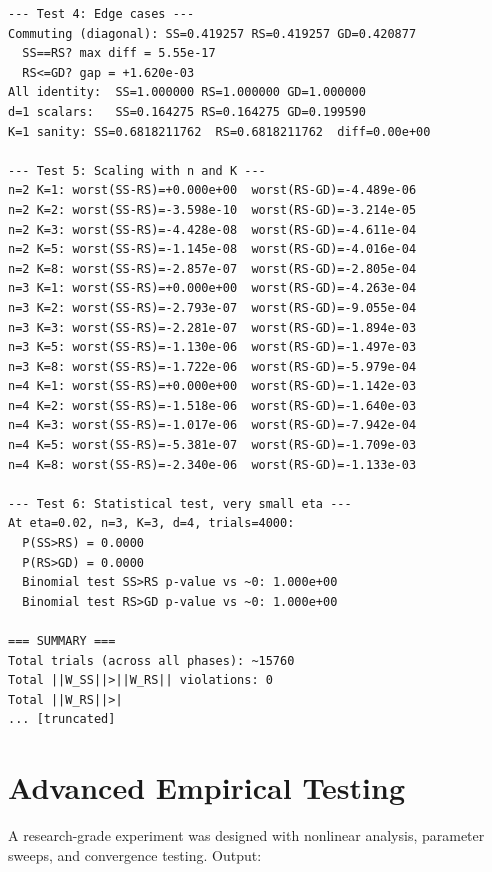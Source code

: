 \documentclass[11pt]{article}
\begin{document}
\begin{lstlisting}
--- Test 4: Edge cases ---
Commuting (diagonal): SS=0.419257 RS=0.419257 GD=0.420877
  SS==RS? max diff = 5.55e-17
  RS<=GD? gap = +1.620e-03
All identity:  SS=1.000000 RS=1.000000 GD=1.000000
d=1 scalars:   SS=0.164275 RS=0.164275 GD=0.199590
K=1 sanity: SS=0.6818211762  RS=0.6818211762  diff=0.00e+00

--- Test 5: Scaling with n and K ---
n=2 K=1: worst(SS-RS)=+0.000e+00  worst(RS-GD)=-4.489e-06
n=2 K=2: worst(SS-RS)=-3.598e-10  worst(RS-GD)=-3.214e-05
n=2 K=3: worst(SS-RS)=-4.428e-08  worst(RS-GD)=-4.611e-04
n=2 K=5: worst(SS-RS)=-1.145e-08  worst(RS-GD)=-4.016e-04
n=2 K=8: worst(SS-RS)=-2.857e-07  worst(RS-GD)=-2.805e-04
n=3 K=1: worst(SS-RS)=+0.000e+00  worst(RS-GD)=-4.263e-04
n=3 K=2: worst(SS-RS)=-2.793e-07  worst(RS-GD)=-9.055e-04
n=3 K=3: worst(SS-RS)=-2.281e-07  worst(RS-GD)=-1.894e-03
n=3 K=5: worst(SS-RS)=-1.130e-06  worst(RS-GD)=-1.497e-03
n=3 K=8: worst(SS-RS)=-1.722e-06  worst(RS-GD)=-5.979e-04
n=4 K=1: worst(SS-RS)=+0.000e+00  worst(RS-GD)=-1.142e-03
n=4 K=2: worst(SS-RS)=-1.518e-06  worst(RS-GD)=-1.640e-03
n=4 K=3: worst(SS-RS)=-1.017e-06  worst(RS-GD)=-7.942e-04
n=4 K=5: worst(SS-RS)=-5.381e-07  worst(RS-GD)=-1.709e-03
n=4 K=8: worst(SS-RS)=-2.340e-06  worst(RS-GD)=-1.133e-03

--- Test 6: Statistical test, very small eta ---
At eta=0.02, n=3, K=3, d=4, trials=4000:
  P(SS>RS) = 0.0000
  P(RS>GD) = 0.0000
  Binomial test SS>RS p-value vs ~0: 1.000e+00
  Binomial test RS>GD p-value vs ~0: 1.000e+00

=== SUMMARY ===
Total trials (across all phases): ~15760
Total ||W_SS||>||W_RS|| violations: 0
Total ||W_RS||>|
... [truncated]
\end{lstlisting}


\section{Advanced Empirical Testing}

A research-grade experiment was designed with nonlinear analysis, parameter sweeps,
and convergence testing. Output:
\end{document}

